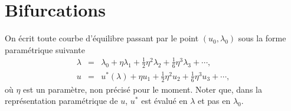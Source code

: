 \documentclass{article}
\begin{document}
\section{Bifurcations}

On {\'e}crit toute courbe d'{\'e}quilibre passant par le point $(u_0,
\lambda_0)$ sous la forme param{\'e}trique suivante
\begin{eqnarray}
  \lambda & = & \lambda_0 + \eta \lambda_1 + \tfrac{1}{2} \eta^2 \lambda_2 +
  \tfrac{1}{6} \eta^3 \lambda_3 + \cdots,  \label{eq20211115075817}\\
  u & = & u^{\ast} (\lambda) + \eta u_1 + \tfrac{1}{2} \eta^2 u_2 +
  \tfrac{1}{6} \eta^3 u_3 + \cdots,  \label{eq20211115075835}
\end{eqnarray}
o{\`u} $\eta$ est un param{\`e}tre, non pr{\'e}cis{\'e} pour le moment. Noter
que, dans la repr{\'e}sentation param{\'e}trique de $u$, $u^{\ast}$ est
{\'e}valu{\'e} en $\lambda$ et pas en $\lambda_0$.
\end{document}
